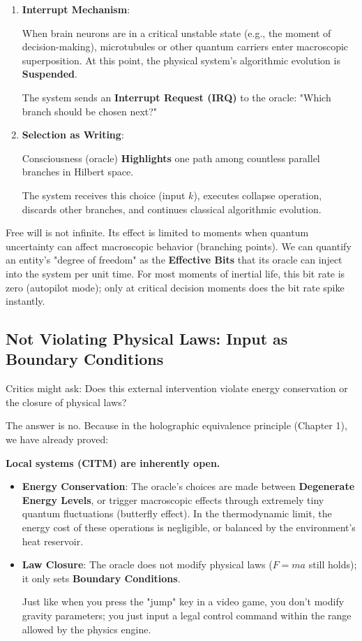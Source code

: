 \begin{enumerate}
\item \textbf{Interrupt Mechanism}:

    When brain neurons are in a critical unstable state (e.g., the moment of decision-making), microtubules or other quantum carriers enter macroscopic superposition. At this point, the physical system's algorithmic evolution is \textbf{Suspended}.

    The system sends an \textbf{Interrupt Request (IRQ)} to the oracle: "Which branch should be chosen next?"

\item \textbf{Selection as Writing}:

    Consciousness (oracle) \textbf{Highlights} one path among countless parallel branches in Hilbert space.

    The system receives this choice (input $k$), executes collapse operation, discards other branches, and continues classical algorithmic evolution.
\end{enumerate}

\begin{corollary}
Free will is not infinite. Its effect is limited to moments when quantum uncertainty can affect macroscopic behavior (branching points). We can quantify an entity's "degree of freedom" as the \textbf{Effective Bits} that its oracle can inject into the system per unit time. For most moments of inertial life, this bit rate is zero (autopilot mode); only at critical decision moments does the bit rate spike instantly.
\end{corollary}

\subsection{Not Violating Physical Laws: Input as Boundary Conditions}

Critics might ask: Does this external intervention violate energy conservation or the closure of physical laws?

The answer is no. Because in the holographic equivalence principle (Chapter 1), we have already proved:

\textbf{Local systems (CITM) are inherently open.}

\begin{itemize}
\item \textbf{Energy Conservation}: The oracle's choices are made between \textbf{Degenerate Energy Levels}, or trigger macroscopic effects through extremely tiny quantum fluctuations (butterfly effect). In the thermodynamic limit, the energy cost of these operations is negligible, or balanced by the environment's heat reservoir.

\item \textbf{Law Closure}: The oracle does not modify physical laws ($F=ma$ still holds); it only sets \textbf{Boundary Conditions}.

    Just like when you press the "jump" key in a video game, you don't modify gravity parameters; you just input a legal control command within the range allowed by the physics engine.
\end{itemize}

